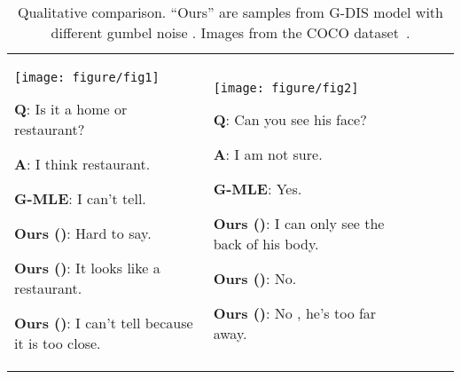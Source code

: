 \documentclass{article}
\begin{document}
\begin{table}[t]
    \vspace{-6pt}
	\renewcommand*{\arraystretch}{0.8}
    \setlength{\tabcolsep}{6px}
    \caption{Qualitative comparison. ``Ours'' are samples from G-DIS model with different gumbel noise . Images from the COCO dataset~\cite{lin2014microsoft}.}
    \label{table:qualititve} 
    \begin{center}\hspace{-5.5pt}
    \begin{tabular}{p{3.0cm} p{3.0cm} p{3.0cm} p{3.0cm} p{2.5cm}}
    \toprule
\vspace{-10pt}
    \center
    \texttt{[image: figure/fig1]}
    \newline\vspace{-10pt}
    \begin{minipage}{2.8cm}
    \begin{compactenum}[\hspace{-6pt}]
    \tiny
    \item \tiny \textbf{Q}: Is it a home or restaurant?
    \item \tiny \textbf{A}: I think restaurant. 
	\item \tiny \textbf{G-MLE}: I can't tell.
	\item \tiny \textbf{Ours ()}: Hard to say.
	\item \tiny \textbf{Ours ()}: It looks like a restaurant.
	\item \tiny \textbf{Ours ()}: I can't tell because it is too close.
    \end{compactenum}
    \end{minipage}
    &
    \vspace{-10pt}
    \center
    \texttt{[image: figure/fig2]}
    \newline\vspace{-10pt}
    \begin{minipage}{2.8cm}
    \begin{compactenum}[\hspace{-6pt}]
    \tiny
    \item \tiny \textbf{Q}: Can you see his face?
    \item \tiny \textbf{A}: I am not sure.
	\item \tiny \textbf{G-MLE}: Yes.
	\item \tiny \textbf{Ours ()}: I can only see the back of his body.
	\item \tiny \textbf{Ours ()}: No.
	\item \tiny \textbf{Ours ()}: No , he's too far away.

\end{compactenum}
\end{minipage}
\end{tabular}
\end{center}
\end{table}
\end{document}
